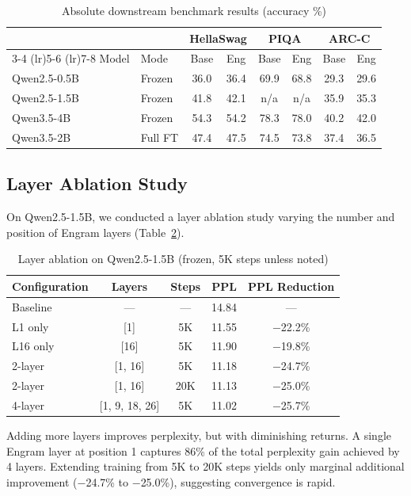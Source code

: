\documentclass{article}
\begin{document}
\begin{table}[H]
\centering
\caption{Absolute downstream benchmark results (accuracy \%)}
\label{tab:downstream}
\small
\begin{tabular}{@{}llcccccc@{}}
\toprule
 & & \multicolumn{2}{c}{HellaSwag} & \multicolumn{2}{c}{PIQA} & \multicolumn{2}{c}{ARC-C} \\
\cmidrule(lr){3-4} \cmidrule(lr){5-6} \cmidrule(lr){7-8}
Model & Mode & Base & Eng & Base & Eng & Base & Eng \\
\midrule
Qwen2.5-0.5B & Frozen & 36.0 & 36.4 & 69.9 & 68.8 & 29.3 & 29.6 \\
Qwen2.5-1.5B & Frozen & 41.8 & 42.1 & n/a & n/a & 35.9 & 35.3 \\
Qwen3.5-4B & Frozen & 54.3 & 54.2 & 78.3 & 78.0 & 40.2 & 42.0 \\
Qwen3.5-2B & Full FT & 47.4 & 47.5 & 74.5 & 73.8 & 37.4 & 36.5 \\
\bottomrule
\end{tabular}
\end{table}

\subsection{Layer Ablation Study}

On Qwen2.5-1.5B, we conducted a layer ablation study varying the number and position of Engram layers (Table~\ref{tab:ablation}).

\begin{table}[H]
\centering
\caption{Layer ablation on Qwen2.5-1.5B (frozen, 5K steps unless noted)}
\label{tab:ablation}
\small
\begin{tabular}{@{}lcccc@{}}
\toprule
Configuration & Layers & Steps & PPL & PPL Reduction \\
\midrule
Baseline & --- & --- & 14.84 & --- \\
L1 only & [1] & 5K & 11.55 & $-$22.2\% \\
L16 only & [16] & 5K & 11.90 & $-$19.8\% \\
2-layer & [1, 16] & 5K & 11.18 & $-$24.7\% \\
2-layer & [1, 16] & 20K & 11.13 & $-$25.0\% \\
4-layer & [1, 9, 18, 26] & 5K & 11.02 & $-$25.7\% \\
\bottomrule
\end{tabular}
\end{table}

Adding more layers improves perplexity, but with diminishing returns. A single Engram layer at position 1 captures 86\% of the total perplexity gain achieved by 4 layers. Extending training from 5K to 20K steps yields only marginal additional improvement ($-$24.7\% to $-$25.0\%), suggesting convergence is rapid.
\end{document}
